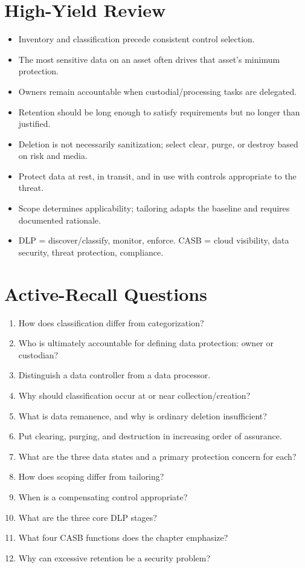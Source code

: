 \documentclass[10pt,letterpaper]{article}
\begin{document}
\section{\color{navy}High-Yield Review}
\begin{itemize}
\item Inventory and classification precede consistent control selection.
\item The most sensitive data on an asset often drives that asset's minimum protection.
\item Owners remain accountable when custodial/processing tasks are delegated.
\item Retention should be long enough to satisfy requirements but no longer than justified.
\item Deletion is not necessarily sanitization; select clear, purge, or destroy based on risk and media.
\item Protect data at rest, in transit, and in use with controls appropriate to the threat.
\item Scope determines applicability; tailoring adapts the baseline and requires documented rationale.
\item DLP = discover/classify, monitor, enforce. CASB = cloud visibility, data security, threat protection, compliance.
\end{itemize}

\section{\color{navy}Active-Recall Questions}
\begin{enumerate}
\item How does classification differ from categorization?
\item Who is ultimately accountable for defining data protection: owner or custodian?
\item Distinguish a data controller from a data processor.
\item Why should classification occur at or near collection/creation?
\item What is data remanence, and why is ordinary deletion insufficient?
\item Put clearing, purging, and destruction in increasing order of assurance.
\item What are the three data states and a primary protection concern for each?
\item How does scoping differ from tailoring?
\item When is a compensating control appropriate?
\item What are the three core DLP stages?
\item What four CASB functions does the chapter emphasize?
\item Why can excessive retention be a security problem?
\end{enumerate}
\end{document}
